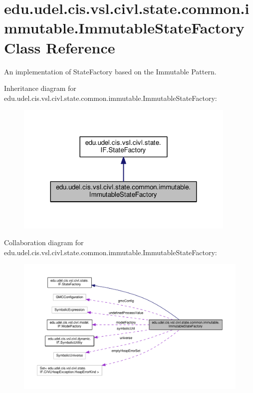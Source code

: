 \hypertarget{classedu_1_1udel_1_1cis_1_1vsl_1_1civl_1_1state_1_1common_1_1immutable_1_1ImmutableStateFactory}{}\section{edu.\+udel.\+cis.\+vsl.\+civl.\+state.\+common.\+immutable.\+Immutable\+State\+Factory Class Reference}
\label{classedu_1_1udel_1_1cis_1_1vsl_1_1civl_1_1state_1_1common_1_1immutable_1_1ImmutableStateFactory}


An implementation of State\+Factory based on the Immutable Pattern.  




Inheritance diagram for edu.\+udel.\+cis.\+vsl.\+civl.\+state.\+common.\+immutable.\+Immutable\+State\+Factory\+:
\nopagebreak
\begin{figure}[H]
\begin{center}
\leavevmode
\includegraphics[width=299pt]{classedu_1_1udel_1_1cis_1_1vsl_1_1civl_1_1state_1_1common_1_1immutable_1_1ImmutableStateFactory__inherit__graph}
\end{center}
\end{figure}


Collaboration diagram for edu.\+udel.\+cis.\+vsl.\+civl.\+state.\+common.\+immutable.\+Immutable\+State\+Factory\+:
\nopagebreak
\begin{figure}[H]
\begin{center}
\leavevmode
\includegraphics[width=350pt]{classedu_1_1udel_1_1cis_1_1vsl_1_1civl_1_1state_1_1common_1_1immutable_1_1ImmutableStateFactory__coll__graph}
\end{center}
\end{figure}
